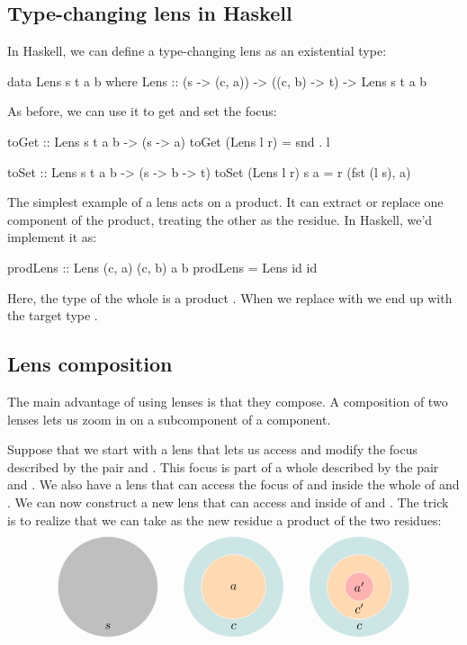 \documentclass[DaoFP]{subfiles}
\begin{document}
\subsection{Type-changing lens in Haskell}
In Haskell, we can define a type-changing lens as an existential type:
\begin{haskell}
data Lens s t a b where
 Lens :: (s -> (c, a)) -> ((c, b) -> t) -> Lens s t a b
\end{haskell}
As before, we can use it to get and set the focus:
\begin{haskell}
toGet :: Lens s t a b -> (s -> a)
toGet (Lens l r) = snd . l

toSet :: Lens s t a b -> (s -> b -> t)
toSet (Lens l r) s a = r (fst (l s), a)
\end{haskell}

The simplest example of a lens acts on a product. It can extract or replace one component of the product, treating the other as the residue. In Haskell, we'd implement it as:
\begin{haskell}
prodLens :: Lens (c, a) (c, b) a b
prodLens = Lens id id
\end{haskell}
Here, the type of the whole is a product . When we replace  with  we end up with the target type .

\subsection{Lens composition}

The main advantage of using lenses is that they compose. A composition of two lenses lets us zoom in on a subcomponent of a component. 

Suppose that we start with a lens that lets us access and modify the focus described by the pair  and . This focus is part of a whole described by the pair  and . We also have a lens that can access the focus of  and  inside the whole of  and . We can now construct a new lens that can access  and  inside of  and . The trick is to realize that we can take as the new residue a product of the two residues:
\[
\begin{tikzpicture}
\filldraw[fill=gray!50, draw=white] (0, 0) circle (1.4);
\node at (0, -1.1) {$s$};
\end{tikzpicture}
\hspace{20pt}
\begin{tikzpicture}
\filldraw[fill=blue!50!green!20, draw=white] (0, 0) circle (1.4);
\filldraw[fill=orange!30, draw=white] (0, 0) circle (0.9);
\node at (0, 0) {$a$};
\node at (0, -1.1) {$c$};
\end{tikzpicture}
\hspace{20pt}
\begin{tikzpicture}
\filldraw[fill=blue!50!green!20, draw=white] (0, 0) circle (1.4);
\filldraw[fill=orange!30, draw=white] (0, 0) circle (0.9);
\filldraw[fill=red!30, draw=white] (0, 0) circle (0.4);
\node at (0, 0) {$a'$};
\node at (0, -0.6) {$c'$};
\node at (0, -1.1) {$c$};
\end{tikzpicture}
\]
\end{document}
